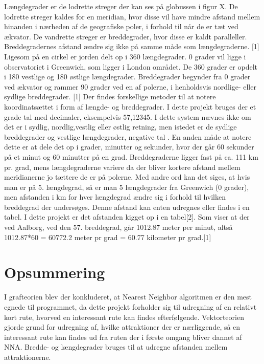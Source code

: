 Længdegrader er de lodrette streger der kan ses på globussen i figur X. De lodrette streger kaldes for en meridian, hvor disse vil have mindre afstand mellem hinanden i nærheden af de geografiske poler, i forhold til når de er tæt ved ækvator. De vandrette streger er breddegrader, hvor disse er kaldt paralleller. Breddegradernes afstand ændre sig ikke på samme måde som længdegraderne. [1] \newline
Ligesom på en cirkel er jorden delt op i 360 længdegrader. 0 grader vil ligge i observatoriet i Greenwich, som ligger i London området. De 360 grader er opdelt i 180 vestlige og 180 østlige længdegrader. Breddegrader begynder fra 0 grader ved ækvator og rammer 90 grader ved en af polerne, i henholdsvis nordlige- eller sydlige breddegrader. [1]\newline
Der findes forskellige metoder til at notere koordinatsættet i form af længde- og breddegrader. I dette projekt bruges der et grade tal med decimaler, eksempelvis 57,12345. I dette system nævnes ikke om det er i sydlig, nordlig,vestlig eller østlig retning, men istedet er de sydlige breddegrader og vestlige længdegrader, negative tal . En anden måde at notere dette er at dele det op i grader, minutter og sekunder, hvor der går 60 sekunder på et minut og 60 minutter på en grad. Breddegraderne ligger fast på ca. 111 km pr. grad, mens længdegraderne variere da der bliver kortere afstand mellem meridianerne jo tættere de er på polerne. Med andre ord kan det siges, at hvis man er på 5. længdegrad, så er man 5 længdegrader fra Greenwich (0 grader), men afstanden i km for hver længdegrad ændre sig i forhold til hvilken breddegrad der undersøges. Denne afstand kan enten udregnes eller findes i en tabel. I dette projekt er det afstanden kigget op i en tabel[2]. Som viser at der ved Aalborg, ved den 57. breddegrad, går 1012.87 meter per minut, altså 1012.87*60 =  60772.2 meter pr grad = 60.77 kilometer pr grad.[1]

\section{Opsummering}
I grafteorien blev der konkluderet, at Nearest Neighbor algoritmen er den mest egnede til programmet, da dette projekt forholder sig til udregning af en relativt kort rute, hvorved en interessant rute kan findes efterfølgende. Vektorteorien gjorde grund for udregning af, hvilke attraktioner der er nærliggende, så en interessant rute kan findes ud fra ruten der i første omgang bliver dannet af NNA. Bredde- og længdegrader bruges til at udregne afstanden mellem attraktionerne.
